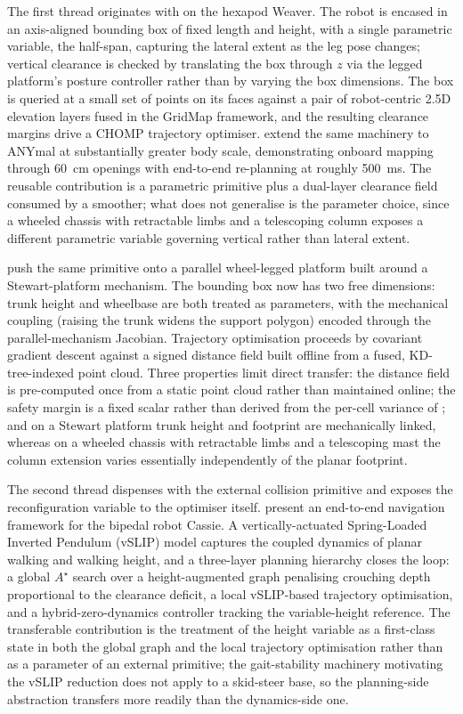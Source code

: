 \documentclass[11pt,a4paper]{article}
\begin{document}
The first thread originates with \citet{buchananWalkingPostureAdaptation2019} on the hexapod Weaver. The robot is encased in an axis-aligned bounding box of fixed length and height, with a single parametric variable, the half-span, capturing the lateral extent as the leg pose changes; vertical clearance is checked by translating the box through $z$ via the legged platform's posture controller rather than by varying the box dimensions. The box is queried at a small set of points on its faces against a pair of robot-centric 2.5D elevation layers fused in the GridMap framework, and the resulting clearance margins drive a CHOMP trajectory optimiser. \citet{PerceptiveWholebodyPlanning} extend the same machinery to ANYmal at substantially greater body scale, demonstrating onboard mapping through 60~cm openings with end-to-end re-planning at roughly 500~ms. The reusable contribution is a parametric primitive plus a dual-layer clearance field consumed by a smoother; what does not generalise is the parameter choice, since a wheeled chassis with retractable limbs and a telescoping column exposes a different parametric variable governing vertical rather than lateral extent.

\citet{DeformableConfigurationPlanning} push the same primitive onto a parallel wheel-legged platform built around a Stewart-platform mechanism. The bounding box now has two free dimensions: trunk height and wheelbase are both treated as parameters, with the mechanical coupling (raising the trunk widens the support polygon) encoded through the parallel-mechanism Jacobian. Trajectory optimisation proceeds by covariant gradient descent against a signed distance field built offline from a fused, KD-tree-indexed point cloud. Three properties limit direct transfer: the distance field is pre-computed once from a static point cloud rather than maintained online; the safety margin is a fixed scalar rather than derived from the per-cell variance of ; and on a Stewart platform trunk height and footprint are mechanically linked, whereas on a wheeled chassis with retractable limbs and a telescoping mast the column extension varies essentially independently of the planar footprint.

The second thread dispenses with the external collision primitive and exposes the reconfiguration variable to the optimiser itself. \citet{liAutonomousNavigationUnderactuated2023} present an end-to-end navigation framework for the bipedal robot Cassie. A vertically-actuated Spring-Loaded Inverted Pendulum (vSLIP) model captures the coupled dynamics of planar walking and walking height, and a three-layer planning hierarchy closes the loop: a global $A^{\star}$ search over a height-augmented graph penalising crouching depth proportional to the clearance deficit, a local vSLIP-based trajectory optimisation, and a hybrid-zero-dynamics controller tracking the variable-height reference. The transferable contribution is the treatment of the height variable as a first-class state in both the global graph and the local trajectory optimisation rather than as a parameter of an external primitive; the gait-stability machinery motivating the vSLIP reduction does not apply to a skid-steer base, so the planning-side abstraction transfers more readily than the dynamics-side one.
\end{document}
